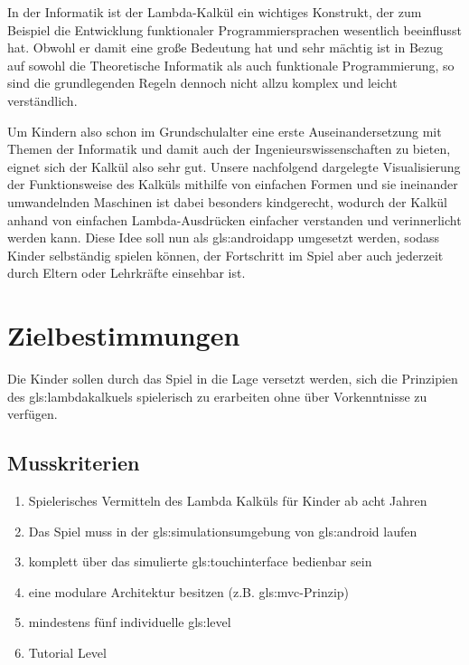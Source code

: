 \documentclass{scrartcl}
\begin{document}
In der Informatik ist der Lambda-Kalkül ein wichtiges Konstrukt, der
zum Beispiel die Entwicklung funktionaler Programmiersprachen wesentlich
beeinflusst hat. Obwohl er damit eine große Bedeutung hat und sehr
mächtig ist in Bezug auf sowohl die Theoretische Informatik als auch
funktionale Programmierung, so sind die grundlegenden Regeln dennoch
nicht allzu komplex und leicht verständlich. 

Um Kindern also schon im Grundschulalter eine erste Auseinandersetzung
mit Themen der Informatik und damit auch der Ingenieurswissenschaften
zu bieten, eignet sich der Kalkül also sehr gut. Unsere nachfolgend
dargelegte Visualisierung der Funktionsweise des Kalküls mithilfe
von einfachen Formen und sie ineinander umwandelnden Maschinen ist
dabei besonders kindgerecht, wodurch der Kalkül anhand von einfachen
Lambda-Ausdrücken einfacher verstanden und verinnerlicht werden kann.
Diese Idee soll nun als \gls{gls:androidapp} umgesetzt werden, sodass Kinder
selbständig spielen können, der Fortschritt im Spiel aber auch jederzeit
durch Eltern oder Lehrkräfte einsehbar ist. 

\clearpage









\section{Zielbestimmungen}


Die Kinder sollen durch das Spiel in die Lage versetzt werden, sich die Prinzipien des \gls{gls:lambdakalkuel}s spielerisch zu erarbeiten ohne über Vorkenntnisse zu verfügen.

\subsection{Musskriterien}

\begin{enumerate}
	\item \label{muss:vermittelnlamba}Spielerisches Vermitteln des Lambda Kalküls für Kinder ab acht Jahren
	\item \label{muss:simulationandroid}Das Spiel muss in der \gls{gls:simulationsumgebung} von \gls{gls:android} laufen
	\item \label{muss:touchinterface}komplett über das simulierte \gls{gls:touchinterface} bedienbar sein
	\item \label{muss:mvc}eine modulare Architektur besitzen (z.B. \gls{gls:mvc}-Prinzip)
	\item \label{muss:5indilevel}mindestens fünf individuelle \gls{gls:level}
	\item \label{muss:tutorial}Tutorial Level
\end{enumerate}
\end{document}
